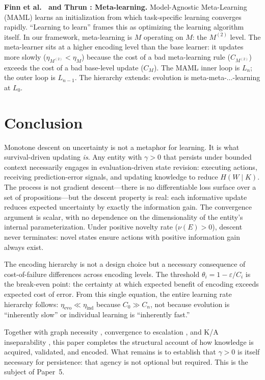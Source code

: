 \documentclass[11pt]{article}
\theoremstyle{definition}
\begin{document}
\textbf{Finn et al.\ \cite{FinnEtAl2017} and Thrun \cite{Thrun1998}:
Meta-learning.}
Model-Agnostic Meta-Learning (MAML) learns an initialization from
which task-specific learning converges rapidly. ``Learning to learn''
\cite{Thrun1998} frames this as optimizing the learning algorithm
itself. In our framework, meta-learning is $M$ operating on $M$:
the $M^{(2)}$ level. The meta-learner sits at a higher encoding level
than the base learner: it updates more slowly ($\eta_{M^{(2)}} <
\eta_M$) because the cost of a bad meta-learning rule ($C_{M^{(2)}}$)
exceeds the cost of a bad base-level update ($C_M$). The MAML inner
loop is $L_n$; the outer loop is $L_{n-1}$. The hierarchy extends:
evolution is meta-meta-$\ldots$-learning at $L_0$.

\section{Conclusion}
\label{sec:conclusion}

Monotone descent on uncertainty is not a metaphor for learning. It is
what survival-driven updating \emph{is}. Any entity with $\gamma > 0$
that persists under bounded context necessarily engages in
evaluation-driven state revision: executing actions, receiving
prediction-error signals, and updating knowledge to reduce $H(W \mid K)$.
The process is not gradient descent---there is no differentiable loss
surface over a set of propositions---but the descent property is real:
each informative update reduces expected uncertainty by exactly the
information gain. The convergence argument is scalar, with no
dependence on the dimensionality of the entity's internal
parameterization. Under positive novelty rate ($\nu(E) > 0$), descent
never terminates: novel states ensure actions with positive information
gain always exist.

The encoding hierarchy is not a design choice but a necessary
consequence of cost-of-failure differences across encoding levels.
The threshold $\theta_i = 1 - \varepsilon / C_i$ is the break-even
point: the certainty at which expected benefit of encoding exceeds
expected cost of error. From
this single equation, the entire learning rate hierarchy follows:
$\eta_{\mathrm{evo}} \ll \eta_{\mathrm{ind}}$ because
$C_0 \gg C_n$, not because evolution is ``inherently slow'' or
individual learning is ``inherently fast.''

Together with graph necessity \cite{McCarthy2026a}, convergence to
escalation \cite{McCarthy2026b}, and K/A inseparability \cite{McCarthy2026c},
this paper completes the structural account of
how knowledge is acquired, validated, and encoded. What remains is to
establish that $\gamma > 0$ is itself necessary for persistence: that
agency is not optional but required. This is the subject of Paper~5.
\end{document}
